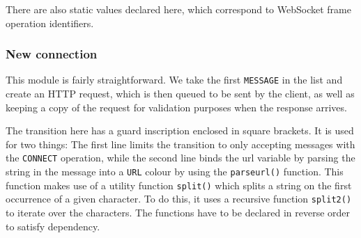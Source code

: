 	There are also static values declared here, which correspond to WebSocket
	frame operation identifiers.
	
	\subsubsection{New connection}
		
		
		This module is fairly straightforward. We take the first \lstinline:MESSAGE:
		in the list and create an HTTP request, which is then queued to be sent by the
		client, as well as keeping a copy of the request for validation purposes when
		the response arrives.
		
		The transition here has a guard inscription enclosed in square brackets. It is
		used for two things:
		The first line limits the transition to only accepting messages with the
		\lstinline:CONNECT:	operation, while the second line binds the url variable
		by parsing the string in the message into a \lstinline:URL:
		colour by using the \lstinline:parseurl(): function. This function makes use of
		a utility function \lstinline:split():  which splits a string on the first
		occurrence of a given character. To do this, it uses a recursive function
		\lstinline:split2(): to iterate over the characters. The functions have to be
		declared in reverse order to satisfy dependency.
		
		
		
